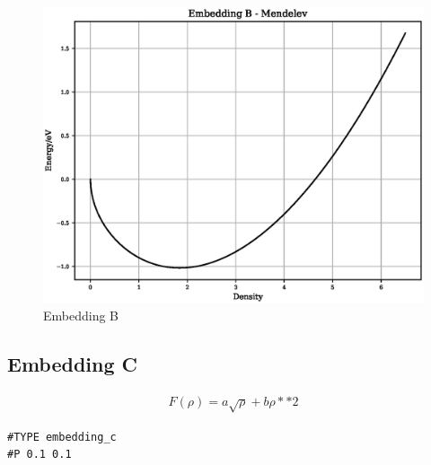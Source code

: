 \documentclass[12pt,twoside]{manual}
\begin{document}
\begin{appendices}
\FloatBarrier
\begin{figure}[h]
  \begin{center}
    \includegraphics[scale=0.5]{img/plots/embedding_b.eps}
    \caption{Embedding B}
    \label{graph:graph1}
  \end{center}
\end{figure}
\FloatBarrier









\subsection{Embedding C}

\begin{equation}
\begin{split}
F(\rho) = a \sqrt{\rho} + b \rho**2
\end{split}
\label{eq:embeddingC}
\end{equation}


\begin{lstlisting}[style=pseudocode,caption={Embedding C}]
#TYPE embedding_c
#P 0.1 0.1
\end{lstlisting}


\end{appendices}
\end{document}
